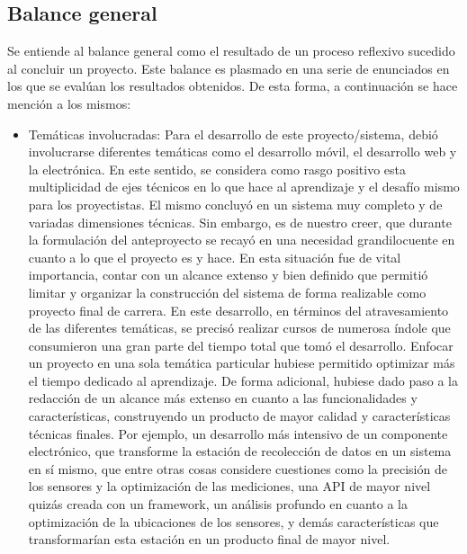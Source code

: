 \subsection{Balance general}

    \par Se entiende al balance general como el resultado de un proceso reflexivo sucedido al concluir un proyecto. Este balance es plasmado en una serie de enunciados en los que se evalúan los resultados obtenidos. De esta forma, a continuación se hace mención a los mismos:
    
    \begin{itemize}

        \item{Temáticas involucradas:} Para el desarrollo de este proyecto/sistema, debió involucrarse diferentes temáticas como el desarrollo móvil, el desarrollo web y la electrónica. En este sentido, se considera como rasgo positivo esta multiplicidad de ejes técnicos en lo que hace al aprendizaje y el desafío mismo para los proyectistas. El mismo concluyó en un sistema muy completo y de variadas dimensiones técnicas. Sin embargo, es de nuestro creer, que durante la formulación del anteproyecto se recayó en una necesidad grandilocuente en cuanto a lo que el proyecto es y hace. En esta situación fue de vital importancia, contar con un alcance extenso y bien definido que permitió limitar y organizar la construcción del sistema de forma realizable como proyecto final de carrera. En este desarrollo, en términos del atravesamiento de las diferentes temáticas, se precisó realizar cursos de numerosa índole que consumieron una gran parte del tiempo total que tomó el desarrollo. Enfocar un proyecto en una sola temática particular hubiese permitido optimizar más el tiempo dedicado al aprendizaje. De forma adicional, hubiese dado paso a la redacción de un alcance más extenso en cuanto a las funcionalidades y características, construyendo un producto de mayor calidad y características técnicas finales. Por ejemplo, un desarrollo más intensivo de un componente electrónico, que transforme la estación de recolección de datos en un sistema en sí mismo, que entre otras cosas considere cuestiones como la precisión de los sensores y la optimización de las mediciones, una API de mayor nivel quizás creada con un framework, un análisis profundo en cuanto a la optimización de la ubicaciones de los sensores, y demás características que transformarían esta estación en un producto final de mayor nivel. 
        

\end{itemize}
